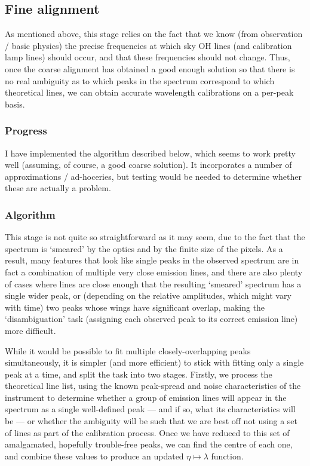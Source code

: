 

\subsection{Fine alignment}

As mentioned above, this stage relies on the fact that we know (from
observation / basic physics) the precise frequencies at which sky OH lines
(and calibration lamp lines) should occur, and that these frequencies should
not change. Thus, once the coarse alignment has obtained a good enough solution
so that there is no real ambiguity as to which peaks in the spectrum correspond
to which theoretical lines, we can obtain accurate wavelength calibrations on a
per-peak basis.

\subsubsection{Progress}

I have implemented the algorithm described below, which seems to work pretty well
(assuming, of course, a good coarse solution). It incorporates a number of
approximations / ad-hoceries, but testing would be needed to determine whether
these are actually a problem.

\subsubsection{Algorithm}

This stage is not quite so straightforward as it may seem, due to the
fact that the spectrum is `smeared' by the optics and by the finite size
of the pixels. As a result, many features that look like single peaks in
the observed spectrum are in fact a combination of multiple very close
emission lines, and there are also plenty of cases where lines are close
enough that the resulting `smeared' spectrum has a single wider peak, or
(depending on the relative amplitudes, which might vary with time) two
peaks whose wings have significant overlap, making the `disambiguation'
task (assigning each observed peak to its correct emission line) more
difficult.

While it would be possible to fit multiple closely-overlapping peaks
simultaneously, it is simpler (and more efficient) to stick with
fitting only a single peak at a time, and split the task into two
stages. Firstly, we process the theoretical line list, using the known
peak-spread and noise characteristics of the instrument to determine
whether a group of emission lines will appear in the spectrum as a
single well-defined peak --- and if so, what its characteristics will
be --- or whether the ambiguity will be such that we are best off not
using a set of lines as part of the calibration process. Once we have
reduced to this set of amalgamated, hopefully trouble-free peaks, we
can find the centre of each one, and combine these values to produce an
updated $\eta \mapsto \lambda$ function.

